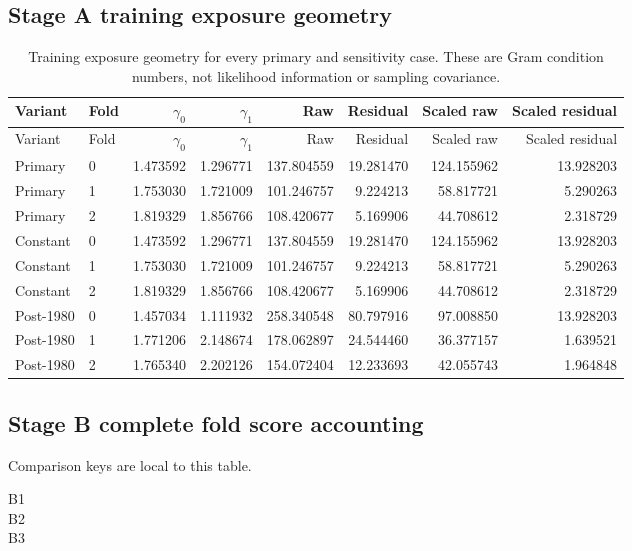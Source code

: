 \subsection{Stage A training exposure geometry}
\label{app:audit09-stage-a-geometry}
{\small
\setlength{\tabcolsep}{3pt}
\begin{longtable}{llrrrrrr}
\caption{Training exposure geometry for every primary and sensitivity case. These are Gram condition numbers, not likelihood information or sampling covariance.}\label{tab:a-geometry}\\
\toprule
Variant & Fold & $\gamma_0$ & $\gamma_1$ & Raw & Residual & Scaled raw & Scaled residual\\\midrule
\endfirsthead
\toprule
Variant & Fold & $\gamma_0$ & $\gamma_1$ & Raw & Residual & Scaled raw & Scaled residual\\\midrule
\endhead
Primary & 0 & 1.473592 & 1.296771 & 137.804559 & 19.281470 & 124.155962 & 13.928203\\
Primary & 1 & 1.753030 & 1.721009 & 101.246757 & 9.224213 & 58.817721 & 5.290263\\
Primary & 2 & 1.819329 & 1.856766 & 108.420677 & 5.169906 & 44.708612 & 2.318729\\
Constant & 0 & 1.473592 & 1.296771 & 137.804559 & 19.281470 & 124.155962 & 13.928203\\
Constant & 1 & 1.753030 & 1.721009 & 101.246757 & 9.224213 & 58.817721 & 5.290263\\
Constant & 2 & 1.819329 & 1.856766 & 108.420677 & 5.169906 & 44.708612 & 2.318729\\
Post-1980 & 0 & 1.457034 & 1.111932 & 258.340548 & 80.797916 & 97.008850 & 13.928203\\
Post-1980 & 1 & 1.771206 & 2.148674 & 178.062897 & 24.544460 & 36.377157 & 1.639521\\
Post-1980 & 2 & 1.765340 & 2.202126 & 154.072404 & 12.233693 & 42.055743 & 1.964848\\
\bottomrule
\end{longtable}
}

\subsection{Stage B complete fold score accounting}
\label{app:audit09-stage-b-folds}
Comparison keys are local to this table. 
\begin{description}
\item[B1] 
\item[B2] 
\item[B3] 
\end{description}

